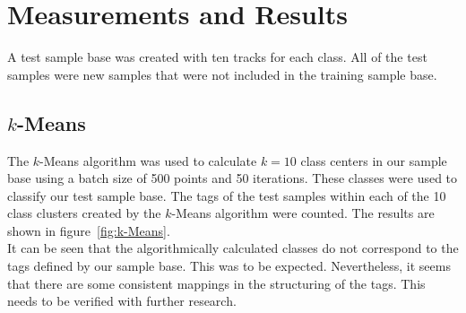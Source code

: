 \section{Measurements and Results}
\label{sec:Measurements}
A test sample base was created with ten tracks for each class. All of the test samples were new samples that were not included in the training sample base.

\subsection{$k$-Means}
The $k$-Means algorithm was used to calculate $k=10$ class centers in our sample base using a batch size of 500 points and 50 iterations. These classes were used to classify our test sample base. The tags of the test samples within each of the 10 class clusters created by the $k$-Means algorithm were counted. The results are shown in figure~\ref{fig:k-Means}.\\
It can be seen that the algorithmically calculated classes do not correspond to the tags defined by our sample base. This was to be expected. Nevertheless, it seems that there are some consistent mappings in the structuring of the tags. This needs to be verified with further research.

